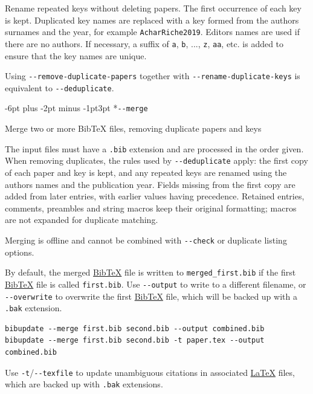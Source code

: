 \documentclass{amsart}
\makeatletter
\newcommand{\BibUpdateOptionHeading}{\@startsection{paragraph}{4}{0pt}
  {-6pt plus -2pt minus -1pt}{3pt}
  {\normalfont\bfseries\color{NavyBlue}}}
\newenvironment{BibUpdateOptionDescription}
  {\begin{list}{}{\setlength{\leftmargin}{2em}\setlength{\rightmargin}{0pt}%
    \setlength{\listparindent}{0pt}%
    \setlength{\topsep}{0pt}\setlength{\parsep}{4pt plus 1pt}%
    \setlength{\itemsep}{0pt}}\item\relax}
  {\end{list}}
\makeatother
\begin{document}
\begin{BibUpdateOptionDescription}

Rename repeated keys without deleting papers. The first occurrence of
each key is kept. Duplicated key names are replaced with a key formed
from the authors\textquotesingle{} surnames and the year, for example
\texttt{AcharRiche2019}. Editors\textquotesingle{} names are used if
there are no authors. If necessary, a suffix of \texttt{a}, \texttt{b},
..., \texttt{z}, \texttt{aa}, etc. is added to ensure that the key names
are unique.

Using \texttt{-\/-remove-duplicate-papers} together with
\texttt{-\/-rename-duplicate-keys} is equivalent to
\texttt{-\/-deduplicate}.

\end{BibUpdateOptionDescription}

\BibUpdateOptionHeading*{\texorpdfstring{\texttt{-\/-merge}}{-\/-merge}}\label{--merge}

\begin{BibUpdateOptionDescription}

Merge two or more BibTeX files, removing duplicate papers and keys

The input files must have a \texttt{.bib} extension and are processed in
the order given. When removing duplicates, the rules used by
\texttt{-\/-deduplicate} apply: the first copy of each paper and key is
kept, and any repeated keys are renamed using the
authors\textquotesingle{} names and the publication year. Fields missing
from the first copy are added from later entries, with earlier values
having precedence. Retained entries, comments, preambles and string
macros keep their original formatting; macros are not expanded for
duplicate matching.

Merging is offline and cannot be combined with \texttt{-\/-check} or
duplicate listing options.

By default, the merged \href{http://www.bibtex.org/}{BibTeX} file is
written to \texttt{merged\_first.bib} if the first
\href{http://www.bibtex.org/}{BibTeX} file is called \texttt{first.bib}.
Use \texttt{-\/-output} to write to a different filename, or
\texttt{-\/-overwrite} to overwrite the first
\href{http://www.bibtex.org/}{BibTeX} file, which will be backed up with
a \texttt{.bak} extension.

\begin{Verbatim}[breaklines=true,fontsize=\small]
bibupdate --merge first.bib second.bib --output combined.bib
bibupdate --merge first.bib second.bib -t paper.tex --output combined.bib
\end{Verbatim}

Use \texttt{-t}/\texttt{-\/-texfile} to update unambiguous citations in
associated \href{https://latex-project.org/}{LaTeX} files, which are
backed up with \texttt{.bak} extensions.

\end{BibUpdateOptionDescription}
\end{document}
